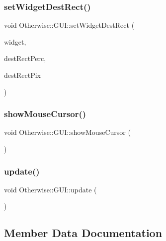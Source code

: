 \subsubsection{\texorpdfstring{set\+Widget\+Dest\+Rect()}{setWidgetDestRect()}}
{\footnotesize\ttfamily void Otherwise\+::\+G\+U\+I\+::set\+Widget\+Dest\+Rect (\begin{DoxyParamCaption}\item[{C\+E\+G\+U\+I\+::\+Window $\ast$}]{widget,  }\item[{const glm\+::vec4 \&}]{dest\+Rect\+Perc,  }\item[{const glm\+::vec4 \&}]{dest\+Rect\+Pix }\end{DoxyParamCaption})\hspace{0.3cm}{\ttfamily [static]}}

\mbox{\label{class_otherwise_1_1_g_u_i_ad684b9943a6c148261f7f5620324be05}} 
\subsubsection{\texorpdfstring{show\+Mouse\+Cursor()}{showMouseCursor()}}
{\footnotesize\ttfamily void Otherwise\+::\+G\+U\+I\+::show\+Mouse\+Cursor (\begin{DoxyParamCaption}{ }\end{DoxyParamCaption})}

\mbox{\label{class_otherwise_1_1_g_u_i_a9a3bc9b03b0910f7cc9968a090cc2af1}} 
\subsubsection{\texorpdfstring{update()}{update()}}
{\footnotesize\ttfamily void Otherwise\+::\+G\+U\+I\+::update (\begin{DoxyParamCaption}{ }\end{DoxyParamCaption})}



\subsection{Member Data Documentation}
\mbox{\label{class_otherwise_1_1_g_u_i_a6d6c577375d688bf2a92ee514d76e2de}} 
